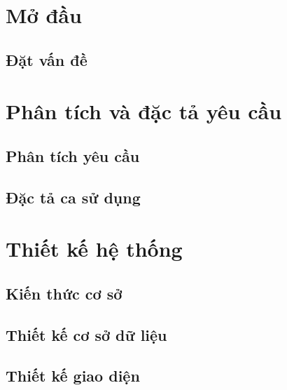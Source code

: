 \documentclass[12pt,a4paper]{report}
\begin{document}
\tableofcontents{}
\clearpage{}

\listoffigures{}

\listoftables{}

\chapter{Mở đầu}

\section{Đặt vấn đề}


\chapter{Phân tích và đặc tả yêu cầu}

\section{Phân tích yêu cầu}


\section{Đặc tả ca sử dụng}


\chapter{Thiết kế hệ thống}

\section{Kiến thức cơ sở}


% 

\section{Thiết kế cơ sở dữ liệu}


\section{Thiết kế giao diện}

\end{document}
